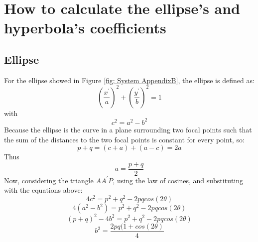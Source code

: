 %
%
\chapter{How to calculate the ellipse's and hyperbola's coefficients}
%
\label{cap:AppendixB}
%
%

\medskip
\section{Ellipse}
For the ellipse showed in Figure \ref{fig: System AppendixB}, the ellipse is defined as:
\begin{equation}
\left( \frac{x^{'}}{a} \right)^2 + \left( \frac{y^{'}}{b} \right)^2 = 1
\end{equation}
with
\begin{equation}
c^2 = a^2 - b^2
\end{equation}
Because the ellipse is the curve in a plane surrounding two focal points such that the sum of the distances to the two focal points is constant for every point, so:
\begin{equation}
p + q = (c + a) + (a - c) = 2 a
\end{equation}
Thus
\begin{equation}
a = \frac{p + q}{2}
\end{equation}
Now, considering the triangle $A A^{'} P $, using the law of cosines, and substituting with the equations above:
\begin{equation}
4 c^2 = p^2 + q^2 - 2 p q cos (2 \theta)
\end{equation}
\begin{equation}
4 (a^2 - b^2) = p^2 + q^2 - 2 p q cos ( 2 \theta)
\end{equation} 
\begin{equation}
(p + q)^2 - 4 b^2 = p^2 + q^2 - 2 p q cos (2 \theta)
\end{equation}
\begin{equation}
b^2 = \frac{2 p q (1 + cos (2 \theta)}{4}
\end{equation}
